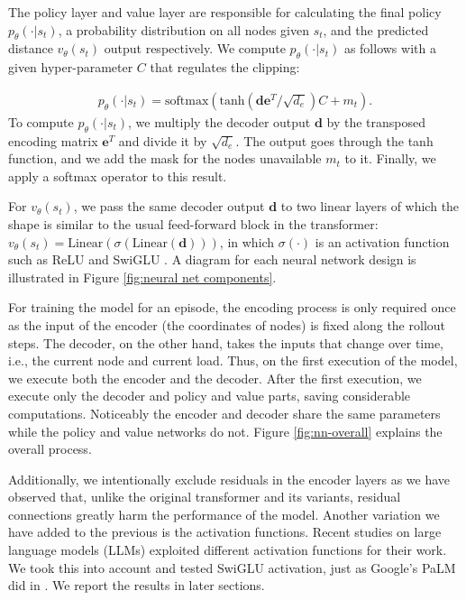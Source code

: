 \documentclass{article}
\begin{document}
The policy layer and value layer are responsible for calculating the final policy $p_{\theta}(\cdot | s_t)$, a probability distribution on all nodes given $s_t$, and the predicted distance $v_{\theta}(s_t)$ output respectively. We compute $p_{\theta}(\cdot | s_t)$ as follows with a given hyper-parameter $C$ that regulates the clipping:

\begin{align}
    p_{\theta}(\cdot | s_t) = \mbox{softmax}(\mbox{tanh}(\mathbf{d}\mathbf{e}^T  / \sqrt{d_e})C + m_t).
\end{align}
To compute $p_{\theta}(\cdot | s_t)$, we multiply the decoder output $\mathbf{d}$ by the transposed encoding matrix $\mathbf{e}^T$ and divide it by $\sqrt{d_e}$. The output goes through the tanh function, and we add the mask for the nodes unavailable $m_t$ to it. Finally, we apply a softmax operator to this result.


For $v_{\theta}(s_t)$, we pass the same decoder output $\mathbf{d}$ to two linear layers of which the shape is similar to the usual feed-forward block in the transformer: $v_{\theta}(s_t) = \mbox{Linear}(\sigma(\mbox{Linear}(\mathbf{d})))$, in which $\sigma(\cdot)$ is an activation function such as ReLU and SwiGLU \cite{agarap2018ReLU, shazeer2020swiglu}. A diagram for each neural network design is illustrated in Figure \ref{fig:neural net components}.

For training the model for an episode, the encoding process is only required once as the input of the encoder (the coordinates of nodes) is fixed along the rollout steps. The decoder, on the other hand, takes the inputs that change over time, i.e., the current node and current load. Thus, on the first execution of the model, we execute both the encoder and the decoder. After the first execution, we execute only the decoder and policy and value parts, saving considerable computations. Noticeably the encoder and decoder share the same parameters while the policy and value networks do not. Figure \ref{fig:nn-overall} explains the overall process.

Additionally, we intentionally exclude residuals in the encoder layers as we have observed that, unlike the original transformer and its variants, residual connections greatly harm the performance of the model. %
Another variation we have added to the previous is the activation functions. Recent studies on large language models (LLMs) exploited different activation functions for their work. We took this into account and tested SwiGLU activation, just as Google's PaLM did in \cite{chowdhery2022palm}. We report the results in later sections.
\end{document}
